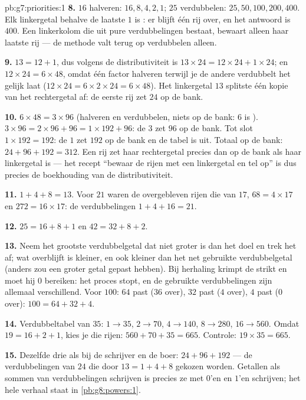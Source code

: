 \begin{solution}{pb:g7:priorities:1}
\textbf{8.} $16$ halveren: $16, 8, 4, 2, 1$; $25$ verdubbelen:
$25, 50, 100, 200, 400$. Elk linkergetal behalve de laatste $1$ is : er blijft
één rij over, en het antwoord is $400$. Een linkerkolom die uit pure
verdubbelingen bestaat, bewaart alleen haar laatste rij --- de methode valt terug
op verdubbelen alleen.

\textbf{9.} $13 = 12 + 1$, dus volgens de distributiviteit is
$13 \times 24 = 12 \times 24 + 1 \times 24$; en $12 \times 24 = 6 \times 48$,
omdat één factor halveren terwijl je de andere verdubbelt het  gelijk laat
($12 \times 24 = 6 \times 2 \times 24 = 6 \times 48$). Het  linkergetal
$13$ splitste één kopie van het rechtergetal af: de eerste rij zet $24$ op de
bank.

\textbf{10.} $6 \times 48 = 3 \times 96$ (halveren en verdubbelen, niets op de
bank: $6$ is ). $3 \times 96 = 2 \times 96 + 96 = 1 \times 192 + 96$: de
 $3$ zet $96$ op de bank. Tot slot $1 \times 192 = 192$: de  $1$ zet
$192$ op de bank en de tabel is uit. Totaal op de bank:
$24 + 96 + 192 = 312$. Een rij zet haar rechtergetal precies dan op de bank als
haar linkergetal  is --- het recept ``bewaar de rijen met een 
linkergetal en tel op'' is dus precies de boekhouding van de distributiviteit.

\textbf{11.} $1 + 4 + 8 = 13$. Voor $21$ waren de overgebleven rijen die van
$17$, $68 = 4 \times 17$ en $272 = 16 \times 17$: de verdubbelingen
$1 + 4 + 16 = 21$.

\textbf{12.} $25 = 16 + 8 + 1$ en $42 = 32 + 8 + 2$.

\textbf{13.} Neem het grootste verdubbelgetal dat niet groter is dan het doel en
trek het af; wat overblijft is kleiner, en ook kleiner dan het net gebruikte
verdubbelgetal (anders zou een groter getal gepast hebben). Bij herhaling krimpt
de  strikt en moet hij $0$ bereiken: het proces stopt, en de gebruikte
verdubbelingen zijn allemaal verschillend. Voor $100$: $64$ past ($36$ over),
$32$ past ($4$ over), $4$ past ($0$ over): $100 = 64 + 32 + 4$.

\textbf{14.} Verdubbeltabel van $35$: $1 \to 35$, $2 \to 70$, $4 \to 140$,
$8 \to 280$, $16 \to 560$. Omdat $19 = 16 + 2 + 1$, kies je die rijen:
$560 + 70 + 35 = 665$. Controle: $19 \times 35 = 665$.

\textbf{15.} Dezelfde drie als bij de schrijver en de boer:
$24 + 96 + 192$ --- de verdubbelingen van $24$ die door $13 = 1 + 4 + 8$ gekozen
worden. Getallen als sommen van verdubbelingen schrijven is precies ze met
$0$'en en $1$'en schrijven; het hele verhaal staat in
\cref{pb:g8:powers:1}.
\end{solution}
